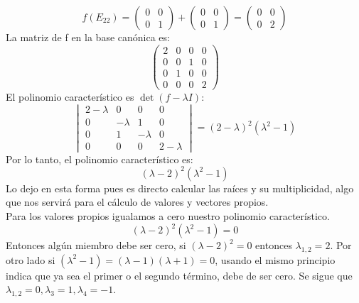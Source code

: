 \begin{solution}
\[   \]
\[
   f(E_{22}) = \begin{pmatrix} 0 & 0 \\ 0 & 1 \end{pmatrix} + \begin{pmatrix} 0 & 0 \\ 0 & 1 \end{pmatrix} = \begin{pmatrix} 0 & 0 \\ 0 & 2 \end{pmatrix}
   \]
   La matriz de f en la base canónica es:
\[
   \begin{pmatrix}
   2 & 0 & 0 & 0 \\
   0 & 0 & 1 & 0 \\
   0 & 1 & 0 & 0 \\
   0 & 0 & 0 & 2
   \end{pmatrix}
   \]
   El polinomio característico es \(\det(f - \lambda I)\):
\[
   \begin{vmatrix}
   2 - \lambda & 0 & 0 & 0 \\
   0 & -\lambda & 1 & 0 \\
   0 & 1 & -\lambda & 0 \\
   0 & 0 & 0 & 2 - \lambda
   \end{vmatrix}
   = (2 - \lambda)^2 (\lambda^2 - 1)
   \]
Por lo tanto, el polinomio característico es:
\[
   (\lambda - 2)^2 (\lambda^2 - 1)
   \]
Lo dejo en esta forma pues es directo calcular las raíces y su multiplicidad, algo que nos servirá para el cálculo de valores y vectores propios. \\
Para los valores propios igualamos a cero nuestro polinomio característico.
\[
   (\lambda - 2)^2 (\lambda^2 - 1) = 0
   \]
Entonces algún miembro debe ser cero, si $(\lambda - 2)^2=0$ entonces $\lambda_{1,2}=2$. Por otro lado si $(\lambda^2 - 1)=(\lambda-1)(\lambda+1)=0$, usando el mismo principio indica que ya sea el primer o el segundo término, debe de ser cero. Se sigue que $\lambda_{1,2}=0, \lambda_3=1, \lambda_4=-1$. \\


\end{solution}
